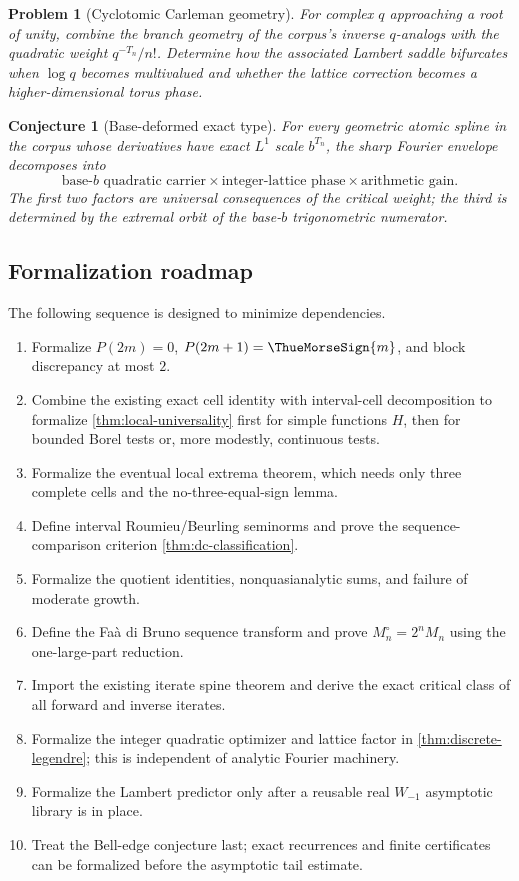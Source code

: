 \documentclass[11pt,a4paper]{article}
\newtheorem{conjecture}[theorem]{Conjecture}
\newtheorem{problem}[theorem]{Problem}
\theoremstyle{definition}
\theoremstyle{remark}
\begin{document}
\begin{problem}[Cyclotomic Carleman geometry]
For complex $q$ approaching a root of unity, combine the branch geometry of the
corpus's inverse $q$-analogs with the quadratic weight
$q^{-T_n}/n!$.  Determine how the associated Lambert saddle bifurcates when
$\log q$ becomes multivalued and whether the lattice correction becomes a
higher-dimensional torus phase.
\end{problem}

\begin{conjecture}[Base-deformed exact type]
For every geometric atomic spline in the corpus whose derivatives have exact
$L^1$ scale $b^{T_n}$, the sharp Fourier envelope decomposes into
\[
 \text{base-$b$ quadratic carrier}
 \times\text{integer-lattice phase}
 \times\text{arithmetic gain}.
\]
The first two factors are universal consequences of the critical weight; the third
is determined by the extremal orbit of the base-$b$ trigonometric numerator.
\end{conjecture}

\subsection{Formalization roadmap}

The following sequence is designed to minimize dependencies.

\begin{enumerate}[label=\textbf{L\arabic*.},leftmargin=2.5em]
\item Formalize $P(2m)=0$, $P(2m+1)=\ThueMorseSign{m}$, and block discrepancy
      at most $2$.
\item Combine the existing exact cell identity with interval-cell decomposition to
formalize \cref{thm:local-universality} first for simple functions $H$, then for
bounded Borel tests or, more modestly, continuous tests.
\item Formalize the eventual local extrema theorem, which needs only three complete
cells and the no-three-equal-sign lemma.
\item Define interval Roumieu/Beurling seminorms and prove the sequence-comparison
criterion \cref{thm:dc-classification}.
\item Formalize the quotient identities, nonquasianalytic sums, and failure of
moderate growth.
\item Define the Fa\`a di Bruno sequence transform and prove
$M_n^\circ=2^nM_n$ using the one-large-part reduction.
\item Import the existing iterate spine theorem and derive the exact critical class
of all forward and inverse iterates.
\item Formalize the integer quadratic optimizer and lattice factor in
\cref{thm:discrete-legendre}; this is independent of analytic Fourier machinery.
\item Formalize the Lambert predictor only after a reusable real $W_{-1}$ asymptotic
library is in place.
\item Treat the Bell-edge conjecture last; exact recurrences and finite certificates
can be formalized before the asymptotic tail estimate.
\end{enumerate}
\end{document}
